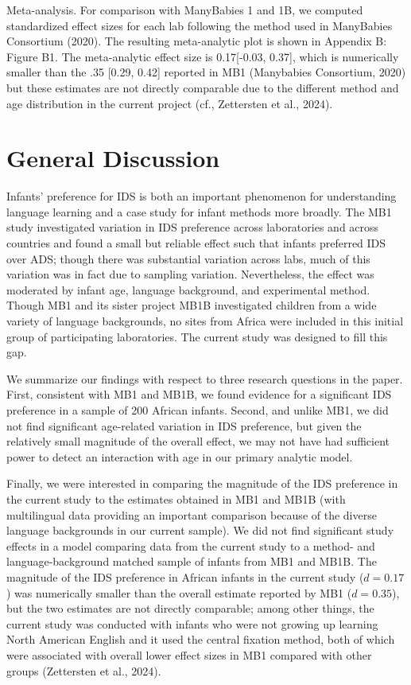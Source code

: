 \documentclass[
  ,man,floatsintext]{apa6}
\begin{document}
Meta-analysis. For comparison with ManyBabies 1 and 1B, we computed standardized effect sizes for each lab following the method used in ManyBabies Consortium (2020). The resulting meta-analytic plot is shown in Appendix B: Figure B1. The meta-analytic effect size is 0.17{[}-0.03, 0.37{]}, which is numerically smaller than the .35 {[}0.29, 0.42{]} reported in MB1 (Manybabies Consortium, 2020) but these estimates are not directly comparable due to the different method and age distribution in the current project (cf., Zettersten et al., 2024).

\hypertarget{general-discussion}{%
\section{General Discussion}\label{general-discussion}}

Infants' preference for IDS is both an important phenomenon for understanding language learning and a case study for infant methods more broadly. The MB1 study investigated variation in IDS preference across laboratories and across countries and found a small but reliable effect such that infants preferred IDS over ADS; though there was substantial variation across labs, much of this variation was in fact due to sampling variation. Nevertheless, the effect was moderated by infant age, language background, and experimental method. Though MB1 and its sister project MB1B investigated children from a wide variety of language backgrounds, no sites from Africa were included in this initial group of participating laboratories. The current study was designed to fill this gap.

We summarize our findings with respect to three research questions in the paper. First, consistent with MB1 and MB1B, we found evidence for a significant IDS preference in a sample of 200 African infants. Second, and unlike MB1, we did not find significant age-related variation in IDS preference, but given the relatively small magnitude of the overall effect, we may not have had sufficient power to detect an interaction with age in our primary analytic model.

Finally, we were interested in comparing the magnitude of the IDS preference in the current study to the estimates obtained in MB1 and MB1B (with multilingual data providing an important comparison because of the diverse language backgrounds in our current sample). We did not find significant study effects in a model comparing data from the current study to a method- and language-background matched sample of infants from MB1 and MB1B. The magnitude of the IDS preference in African infants in the current study (\(d = 0.17\)) was numerically smaller than the overall estimate reported by MB1 (\(d = 0.35\)), but the two estimates are not directly comparable; among other things, the current study was conducted with infants who were not growing up learning North American English and it used the central fixation method, both of which were associated with overall lower effect sizes in MB1 compared with other groups (Zettersten et al., 2024).
\end{document}
